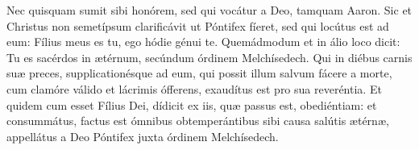 Nec quisquam sumit sibi honórem, sed qui vocátur a Deo, tamquam Aaron.
Sic et Christus non semetípsum clarificávit ut Póntifex fíeret,
	sed qui locútus est ad eum: Fílius meus es tu, ego hódie génui te.
Quemádmodum et in álio loco dicit:
	Tu es sacérdos in ætérnum, secúndum órdinem Melchísedech.
Qui in diébus carnis suæ preces, supplicationésque ad eum,
	qui possit illum salvum fácere a morte, cum clamóre válido et lácrimis ófferens,
	exaudítus est pro sua reveréntia.
Et quidem cum esset Fílius Dei, dídicit ex iis, quæ passus est, obediéntiam:
	et consummátus, factus est ómnibus obtemperántibus sibi causa salútis ætérnæ,
	appellátus a Deo Póntifex juxta órdinem Melchísedech.
